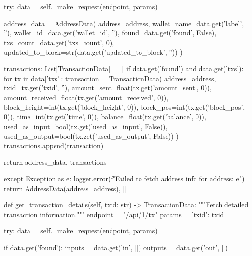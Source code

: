 \begin{codelisting}[language=Python, caption=Основной скрипт сбора данных]
        try:
            data = self._make_request(endpoint, params)
            
            address_data = AddressData(
                address=address,
                wallet_name=data.get('label', ''),
                wallet_id=data.get('wallet_id', ''),
                found=data.get('found', False),
                txs_count=data.get('txs_count', 0),
                updated_to_block=str(data.get('updated_to_block', ''))
            )
            
            transactions: List[TransactionData] = []
            if data.get('found') and data.get('txs'):
                for tx in data['txs']:
                    transaction = TransactionData(
                        address=address,
                        txid=tx.get('txid', ''),
                        amount_sent=float(tx.get('amount_sent', 0)),
                        amount_received=float(tx.get('amount_received', 0)),
                        block_height=int(tx.get('block_height', 0)),
                        block_pos=int(tx.get('block_pos', 0)),
                        time=int(tx.get('time', 0)),
                        balance=float(tx.get('balance', 0)),
                        used_as_input=bool(tx.get('used_as_input', False)),
                        used_as_output=bool(tx.get('used_as_output', False))
                    )
                    transactions.append(transaction)
            
            return address_data, transactions
            
        except Exception as e:
            logger.error(f"Failed to fetch address info for {address}: {e}")
            return AddressData(address=address), []
    
    def get_transaction_details(self, txid: str) -> TransactionData:
        """Fetch detailed transaction information."""
        endpoint = "/api/1/tx"
        params = {'txid': txid}
        
        try:
            data = self._make_request(endpoint, params)
            
            if data.get('found'):
                inputs = data.get('in', [])
                outputs = data.get('out', [])
                

\end{codelisting}
